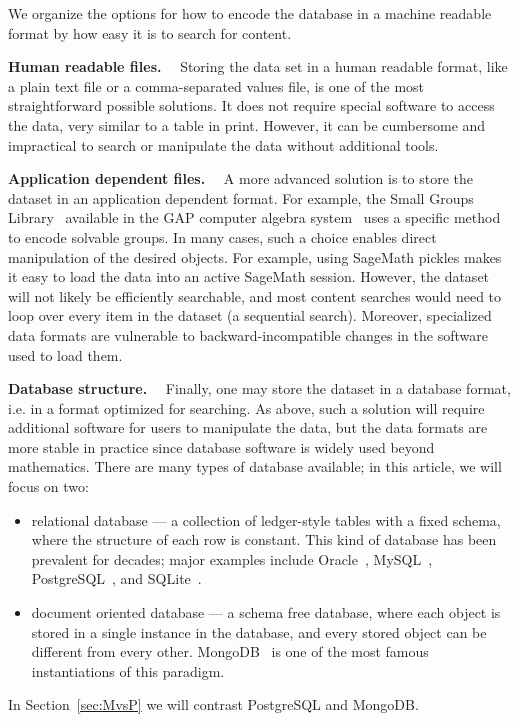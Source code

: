 \documentclass{amsart}
\newcommand{\subhead}[1]{\vspace{0.1in} \noindent \textbf{#1.}\ \ }
\begin{document}
We organize the options for how to encode the database in a machine readable format by how easy it is to search for content.

\subhead{Human readable files}
     Storing the data set in a human readable format, like a  plain text file or a comma-separated values file, is one of the most straightforward possible solutions.
     It does not require special software to access the data, very similar to a table in print.
    However, it can be cumbersome and impractical to search or manipulate the data without additional tools.

\subhead{Application dependent files}
    A more advanced solution is to store the dataset in an application dependent format.
    For example, the Small Groups Library~\cite{smallgroups} available in the GAP computer algebra system~\cite{gap} uses a specific method to encode solvable groups.
    In many cases, such a choice enables direct manipulation of the desired objects.
    For example, using SageMath pickles makes it easy to load the data into an active SageMath session.
    However, the dataset will not likely be efficiently searchable, and most content searches would need to loop over every item in the dataset (a sequential search).
    Moreover, specialized data formats are vulnerable to backward-incompatible changes in the software used to load them.

\subhead{Database structure}
    Finally, one may store the dataset in a database format, i.e. in a format optimized for searching.
    As above, such a solution will require additional software for users to manipulate the data, but the data formats are more stable in practice since database software is widely used beyond mathematics.
    There are many types of database available; in this article, we will focus on two:
    \begin{itemize}
      \item relational database --- a collection of ledger-style tables with a fixed schema, where the structure of each row is constant.
        This kind of database has been prevalent for decades; major examples include Oracle~\cite{oracle}, MySQL~\cite{mysql}, PostgreSQL~\cite{postgres}, and SQLite~\cite{sqlite}.
      \item document oriented database --- a schema free database, where each object is stored in a single instance in the database, and every stored object can be different from every other.
        MongoDB~\cite{mongo} is one of the most famous instantiations of this paradigm.
    \end{itemize}
    In Section~\ref{sec:MvsP} we will contrast PostgreSQL and MongoDB.
\end{document}
